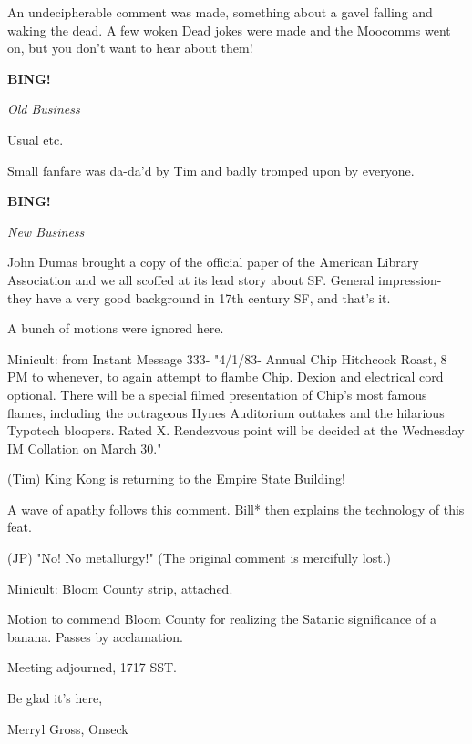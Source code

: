 \documentclass[12pt]{article}
\newcommand{\bing}{{\bf BING!} }
\newcommand{\goto}[1]{\bing \vskip 12pt \centerline{{\em{#1}}}}
\begin{document}
An undecipherable comment was made, something about a gavel falling and waking the dead. A few woken Dead jokes were made and the Moocomms went on, but you don't want to hear about them!

\goto{Old Business}

Usual etc.

Small fanfare was da-da'd by Tim and badly tromped upon by everyone.

\goto{New Business}

John Dumas brought a copy of the official paper of the American Library Association and we all scoffed at its lead story about SF. General impression- they have a very good background in 17th century SF, and that's it.

A bunch of motions were ignored here.

Minicult: from Instant Message 333- "4/1/83- Annual Chip Hitchcock Roast, 8 PM to whenever, to again attempt to flambe Chip. Dexion and electrical cord optional. There will be a special filmed presentation of Chip's most famous flames, including the outrageous Hynes Auditorium outtakes and the hilarious Typotech bloopers. Rated X. Rendezvous point will be decided at the Wednesday IM Collation on March 30."

(Tim) King Kong is returning to the Empire State Building!

A wave of apathy follows this comment. Bill* then explains the technology of this feat.

(JP) "No! No metallurgy!" (The original comment is mercifully lost.)

Minicult: Bloom County strip, attached.

Motion to commend Bloom County for realizing the Satanic significance of a banana. Passes by acclamation.

\vspace{12pt}

\noindent
Meeting adjourned, 1717 SST.

\vspace{18pt}

\centerline{Be glad it's here,}
\centerline{Merryl Gross, Onseck}
\end{document}
